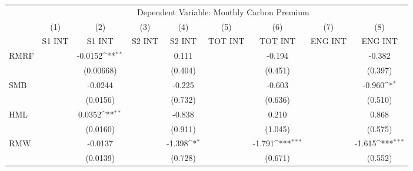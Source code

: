 {
\def\sym#1{\ifmmode^{#1}\else\(^{#1}\)\fi}
\begin{tabular}{l*{8}{c}}
\hline\hline
                    &\multicolumn{8}{c}{Dependent Variable: Monthly Carbon Premium}                                                                                                                 \\\cmidrule(lr){2-9}
                    &\multicolumn{1}{c}{(1)}&\multicolumn{1}{c}{(2)}&\multicolumn{1}{c}{(3)}&\multicolumn{1}{c}{(4)}&\multicolumn{1}{c}{(5)}&\multicolumn{1}{c}{(6)}&\multicolumn{1}{c}{(7)}&\multicolumn{1}{c}{(8)}\\
                    &\multicolumn{1}{c}{S1 INT}&\multicolumn{1}{c}{S1 INT}&\multicolumn{1}{c}{S2 INT}&\multicolumn{1}{c}{S2 INT}&\multicolumn{1}{c}{TOT INT}&\multicolumn{1}{c}{TOT INT}&\multicolumn{1}{c}{ENG INT}&\multicolumn{1}{c}{ENG INT}\\
\hline
RMRF                &                     &     -0.0152\sym{**} &                     &       0.111         &                     &      -0.194         &                     &      -0.382         \\
                    &                     &   (0.00668)         &                     &     (0.404)         &                     &     (0.451)         &                     &     (0.397)         \\
SMB                 &                     &     -0.0244         &                     &      -0.225         &                     &      -0.603         &                     &      -0.960\sym{*}  \\
                    &                     &    (0.0156)         &                     &     (0.732)         &                     &     (0.636)         &                     &     (0.510)         \\
HML                 &                     &      0.0352\sym{**} &                     &      -0.838         &                     &       0.210         &                     &       0.868         \\
                    &                     &    (0.0160)         &                     &     (0.911)         &                     &     (1.045)         &                     &     (0.575)         \\
RMW                 &                     &     -0.0137         &                     &      -1.398\sym{*}  &                     &      -1.791\sym{***}&                     &      -1.615\sym{***}\\
                    &                     &    (0.0139)         &                     &     (0.728)         &                     &     (0.671)         &                     &     (0.552)         \\

\end{tabular}}

